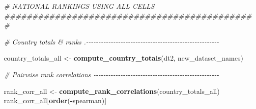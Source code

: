 \documentclass[
  11pt,
]{article}
\newenvironment{Shaded}{\begin{snugshade}}{\end{snugshade}}
\newcommand{\CommentTok}[1]{\textcolor[rgb]{0.56,0.35,0.01}{\textit{#1}}}
\newcommand{\FunctionTok}[1]{\textcolor[rgb]{0.13,0.29,0.53}{\textbf{#1}}}
\newcommand{\NormalTok}[1]{#1}
\newcommand{\OtherTok}[1]{\textcolor[rgb]{0.56,0.35,0.01}{#1}}
\newcommand{\SpecialCharTok}[1]{\textcolor[rgb]{0.81,0.36,0.00}{\textbf{#1}}}
\begin{document}
\begin{Shaded}
\begin{Highlighting}[]
\CommentTok{\# NATIONAL RANKINGS USING ALL CELLS \#\#\#\#\#\#\#\#\#\#\#\#\#\#\#\#\#\#\#\#\#\#\#\#\#\#\#\#\#\#\#\#\#\#\#\#\#\#\#\#\#\#\#\#\#}

\CommentTok{\# Country totals \& ranks .{-}{-}{-}{-}{-}{-}{-}{-}{-}{-}{-}{-}{-}{-}{-}{-}{-}{-}{-}{-}{-}{-}{-}{-}{-}{-}{-}{-}{-}{-}{-}{-}{-}{-}{-}{-}{-}{-}{-}{-}{-}{-}{-}{-}{-}{-}{-}{-}{-}{-}{-}{-}{-}{-}}

\NormalTok{country\_totals\_all }\OtherTok{\textless{}{-}} \FunctionTok{compute\_country\_totals}\NormalTok{(dt2, new\_dataset\_names)}

\CommentTok{\# Pairwise rank correlations {-}{-}{-}{-}{-}{-}{-}{-}{-}{-}{-}{-}{-}{-}{-}{-}{-}{-}{-}{-}{-}{-}{-}{-}{-}{-}{-}{-}{-}{-}{-}{-}{-}{-}{-}{-}{-}{-}{-}{-}{-}{-}{-}{-}{-}{-}{-}{-}{-}{-}{-}}

\NormalTok{rank\_corr\_all }\OtherTok{\textless{}{-}} \FunctionTok{compute\_rank\_correlations}\NormalTok{(country\_totals\_all)}
\NormalTok{rank\_corr\_all[}\FunctionTok{order}\NormalTok{(}\SpecialCharTok{{-}}\NormalTok{spearman)]}
\end{Highlighting}
\end{Shaded}
\end{document}
